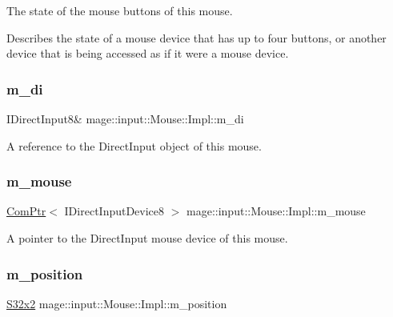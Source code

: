 The state of the mouse buttons of this mouse.

Describes the state of a mouse device that has up to four buttons, or another device that is being accessed as if it were a mouse device. \mbox{\label{classmage_1_1input_1_1_mouse_1_1_impl_af356557a537747ee5c852dba02795931}} 
\subsubsection{\texorpdfstring{m\+\_\+di}{m\_di}}
{\footnotesize\ttfamily I\+Direct\+Input8\& mage\+::input\+::\+Mouse\+::\+Impl\+::m\+\_\+di\hspace{0.3cm}{\ttfamily [private]}}

A reference to the Direct\+Input object of this mouse. \mbox{\label{classmage_1_1input_1_1_mouse_1_1_impl_a1c5de7f34edab12846e75cf7d2b76094}} 
\subsubsection{\texorpdfstring{m\+\_\+mouse}{m\_mouse}}
{\footnotesize\ttfamily \mbox{\hyperlink{namespacemage_ae74f374780900893caa5555d1031fd79}{Com\+Ptr}}$<$ I\+Direct\+Input\+Device8 $>$ mage\+::input\+::\+Mouse\+::\+Impl\+::m\+\_\+mouse\hspace{0.3cm}{\ttfamily [private]}}

A pointer to the Direct\+Input mouse device of this mouse. \mbox{\label{classmage_1_1input_1_1_mouse_1_1_impl_aaf430602e56efbeeae8d46012be4437e}} 
\subsubsection{\texorpdfstring{m\+\_\+position}{m\_position}}
{\footnotesize\ttfamily \mbox{\hyperlink{namespacemage_a4843c424aae7bb5fb6c440ed6ed593ee}{S32x2}} mage\+::input\+::\+Mouse\+::\+Impl\+::m\+\_\+position\hspace{0.3cm}{\ttfamily [private]}}

